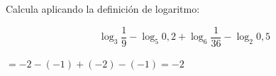 \documentclass[addpoints,spanish, 12pt,a4paper]{exam}
\begin{document}
\begin{questions}
\addpoints




\question[1] Calcula aplicando la definición de logaritmo:

\[\log_3 \frac{1}{9} -  \log_5 0,2 +\log_6 \frac{1}{36} - \log_2 0,5\]
\begin{solution}
$=-2-\left(-1\right)+\left(-2\right)-\left(-1\right)=-2$
\end{solution}




\addpoints









\end{questions}
\end{document}

